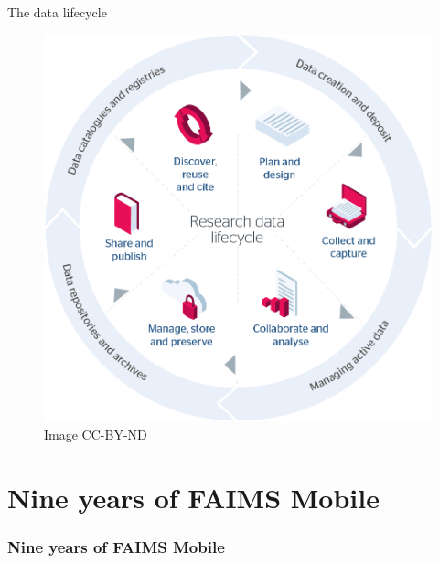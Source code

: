 \documentclass[
	aspectratio=169, %
	12pt, %
	t, %
]{beamer}
\begin{document}
\begin{refsegment}


\begin{frame}{The data lifecycle}
 \begin{figure}[H]
    \centering
    \vspace{-0.5cm}
        \includegraphics[height=.75\textheight]{figures/research-data-life-diagram.png}
        \caption{\cite{Jisc2018-gx} Image CC-BY-ND}
        \label{fig:figure9}
 \end{figure}
\end{frame}




\section{Nine years of FAIMS Mobile}

\begin{sectionframe} %
	\frametitle{Nine years of FAIMS Mobile}


\end{sectionframe}



\end{refsegment}
\end{document}
